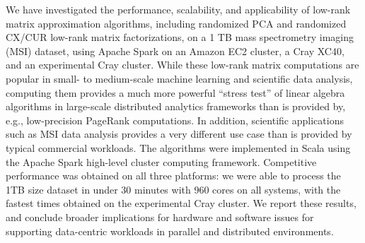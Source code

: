 We have investigated the performance, scalability, and applicability of low-rank matrix approximation algorithms, including randomized PCA and randomized CX/CUR low-rank matrix factorizations, on a 1 TB mass spectrometry imaging (MSI) dataset, using Apache Spark on an Amazon EC2 cluster, a Cray XC40, and an experimental Cray cluster.  
While these low-rank matrix computations are popular in small- to medium-scale machine learning and scientific data analysis, computing them provides a much more powerful ``stress test'' of linear algebra algorithms in large-scale distributed analytics frameworks than is provided by, e.g., low-precision PageRank computations.
In addition, scientific applications such as MSI data analysis provides a very different use case 
than is provided by typical commercial workloads.
The algorithms were implemented in Scala using the Apache Spark high-level cluster computing framework.  
Competitive performance was obtained on all three platforms: we were able to process the 1TB size dataset in under 30 minutes with 960 cores on all systems, with the fastest times obtained on the experimental Cray cluster.
We report these results, and conclude broader implications for hardware and software issues for supporting data-centric workloads in parallel and distributed environments.  

